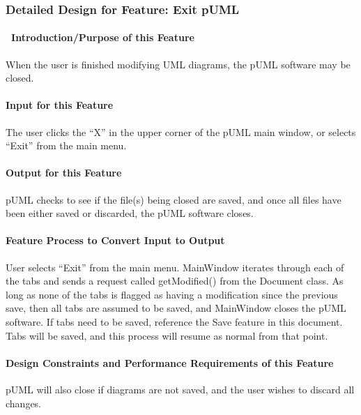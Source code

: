 \documentclass[twoside,letterpaper]{article}
\begin{document}
{%
%

\subsubsection{Detailed Design for Feature: Exit pUML }
\paragraph[\ Introduction/Purpose of this Feature]
{\ Introduction/Purpose of this Feature}
{
When the user is finished modifying UML diagrams, the pUML software may be closed.
}

\paragraph[Input for this Feature]{Input for this Feature}
{
The user clicks the ``X'' in the upper corner of the pUML main window, or selects ``Exit'' from the main menu.
}

\paragraph{Output for this Feature}
{
pUML checks to see if the file(s) being closed are saved, and once all files have been either saved or discarded, the pUML software closes.
}

\paragraph{Feature Process to Convert Input to Output}
{
User selects ``Exit'' from the main menu.  MainWindow iterates through each of the tabs and sends a request called getModified() from the Document class. As long as none of the tabs is flagged as having a modification since the previous save, then all tabs are assumed to be saved, and MainWindow closes the pUML software.
\newline
If tabs need to be saved, reference the Save feature in this document. Tabs will be saved, and this process will resume as normal from that point.
}

\paragraph{Design Constraints and Performance Requirements of this Feature}
{
pUML will also close if diagrams are not saved, and the user wishes to discard all changes. 
}
\bigskip

}
\end{document}
